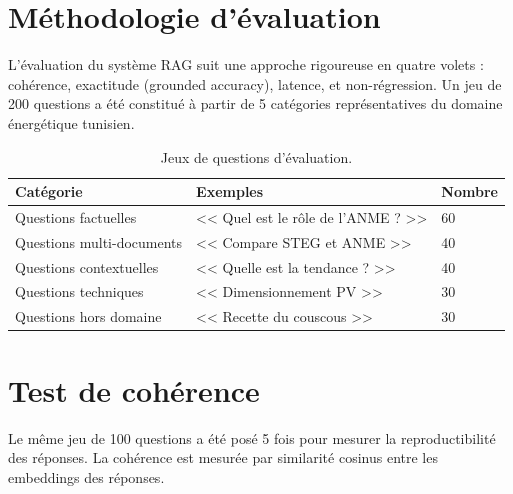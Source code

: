 \documentclass[12pt,a4paper,oneside]{report}
\begin{document}
\section{M\'{e}thodologie d'\'{e}valuation}



L'\'{e}valuation du syst\`{e}me RAG suit une approche rigoureuse en quatre volets : coh\'{e}rence, exactitude (grounded accuracy), latence, et non-r\'{e}gression. Un jeu de 200 questions a \'{e}t\'{e} constitu\'{e} \`{a} partir de 5 cat\'{e}gories repr\'{e}sentatives du domaine \'{e}nerg\'{e}tique tunisien.



\begin{table}[htbp]\centering

\begin{tabular}{@{}p{4cm}p{3cm}p{3cm}@{}}

\toprule

\textbf{Cat\'{e}gorie} & \textbf{Exemples} & \textbf{Nombre} \\

\midrule

Questions factuelles & << Quel est le r\^{o}le de l'ANME ? >> & 60 \\

Questions multi-documents & << Compare STEG et ANME >> & 40 \\

Questions contextuelles & << Quelle est la tendance ? >> & 40 \\

Questions techniques & << Dimensionnement PV >> & 30 \\

Questions hors domaine & << Recette du couscous >> & 30 \\

\bottomrule

\end{tabular}

\caption{Jeux de questions d'\'{e}valuation.}\label{tab:eval_questions}

\end{table}



\section{Test de coh\'{e}rence}



Le m\^{e}me jeu de 100 questions a \'{e}t\'{e} pos\'{e} 5 fois pour mesurer la reproductibilit\'{e} des r\'{e}ponses. La coh\'{e}rence est mesur\'{e}e par similarit\'{e} cosinus entre les embeddings des r\'{e}ponses.
\end{document}
